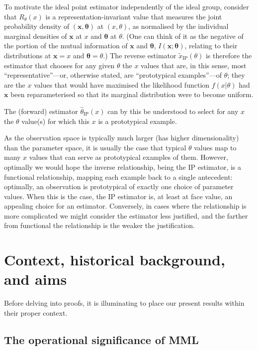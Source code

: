 \documentclass{IEEEtran}
\begin{document}
To motivate the ideal point estimator independently of the ideal group,
consider that $R_\theta(x)$ is
a representation-invariant value that measures the joint probability density
of $(\boldsymbol{x},\boldsymbol{\theta})$ at $(x,\theta)$, as normalised by
the individual marginal densities of $\boldsymbol{x}$ at $x$
and $\boldsymbol{\theta}$ at $\theta$. (One can think of it as the negative
of the portion of the mutual information of $\boldsymbol{x}$ and
$\boldsymbol{\theta}$, $I(\boldsymbol{x};\boldsymbol{\theta})$, relating
to their distributions at $\boldsymbol{x}=x$ and $\boldsymbol{\theta}=\theta$.)
The
reverse estimator $\tilde{x}_{\text{IP}}(\theta)$ is therefore the estimator
that chooses for any given $\theta$ the $x$ values that are, in this
sense, most ``representative''---or, otherwise stated, are
``prototypical examples''---of $\theta$; they are the $x$ values that
would have maximised the likelihood function $f(x|\theta)$ had $\boldsymbol{x}$
been reparameterised so that its marginal distribution were to become uniform.

The (forward) estimator
$\hat{\theta}_{\text{IP}}(x)$ can by this be understood to select for any $x$
the $\theta$ value(s) for which this $x$ is a prototypical example.

As the observation space is typically much larger (has higher dimensionality)
than the parameter space, it is usually the case that typical $\theta$ values
map to many $x$ values that can serve as prototypical examples of them.
However, optimally we would hope the inverse relationship, being the IP
estimator, is a functional relationship, mapping each example back to a single
antecedent: optimally, an observation is prototypical of exactly one
choice of parameter values. When this is the case, the IP estimator is,
at least at face value, an appealing choice for an
estimator. Conversely, in cases where the relationship is more complicated
we might consider the estimator less justified, and the farther
from functional the relationship is the weaker the justification.

\section{Context, historical background, and aims}\label{S:context}

Before delving into proofs, it is illuminating to place our present
results within their proper context.

\subsection{The operational significance of MML}
\end{document}
